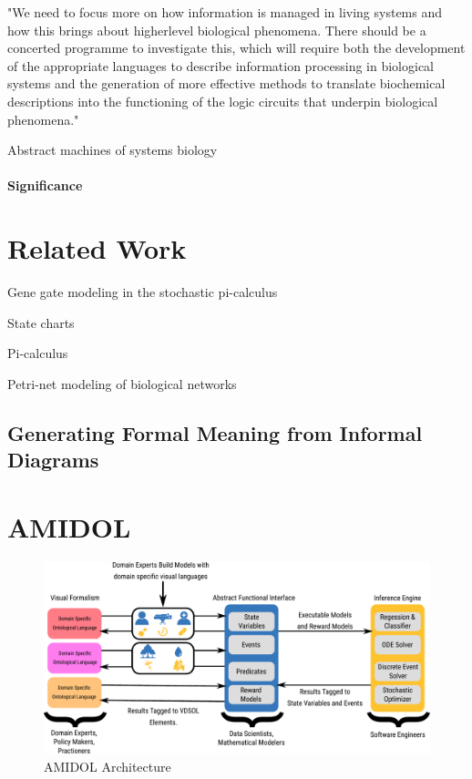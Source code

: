 \documentclass[11pt]{article}
\begin{document}
"We need to focus more
on how information is managed in living
systems and how this brings about higherlevel biological phenomena. There should be
a concerted programme to investigate this,
which will require both the development of
the appropriate languages to describe information processing in biological systems and
the generation of more effective methods to
translate biochemical descriptions into the
functioning of the logic circuits that underpin
biological phenomena." \cite{nurse2008life}

Abstract machines of systems biology \cite{cardelli2005abstract}

\paragraph{Significance}

\section{Related Work}

Gene gate modeling in the stochastic pi-calculus \cite{blossey2008compositionality}

State charts \cite{harel1987statecharts}

Pi-calculus \cite{sangiorgi2003pi}

Petri-net modeling of biological networks \cite{chaouiya2007petri}

\subsection{Generating Formal Meaning from Informal Diagrams}

\section{AMIDOL}

\begin{figure}
  \includegraphics[width=\textwidth]{figs/system-architecture-quad.pdf}
  \caption{AMIDOL Architecture}
\end{figure}
\end{document}
